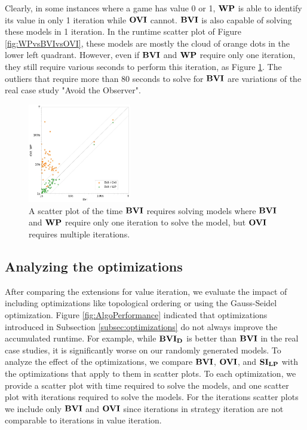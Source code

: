 Clearly, in some instances where a game has value 0 or 1, $\mathbf{WP}$ is able to identify its value in only 1 iteration while $\mathbf{OVI}$ cannot.
$\BVI$ is also capable of solving these models in 1 iteration.
In the runtime scatter plot of Figure \ref{fig:WPvsBVIvsOVI}, these models are mostly the cloud of orange dots in the lower left quadrant.
However, even if $\BVI$ and $\mathbf{WP}$ require only one iteration, they still require various seconds to perform this iteration, as Figure \ref{fig:BVI1IterationTime}.
The outliers that require more than 80 seconds to solve for $\BVI$ are variations of the real case study "Avoid the Observer".
\begin{figure}[h!]
    \centering
    \includegraphics[width=0.4\textwidth]{figures/BVI_1_Iteration_vs_OVI.jpg}
    \caption[Time $\BVI$ requires solving models where it only needs one iteration]{
        A scatter plot of the time $\BVI$ requires solving models where $\BVI$ and $\mathbf{WP}$ require only one iteration to solve the model, 
        but $\mathbf{OVI}$ requires multiple iterations. 
    }
    \label{fig:BVI1IterationTime}
\end{figure}
\FloatBarrier

\subsection{Analyzing the optimizations}
After comparing the extensions for value iteration, we evaluate the impact of including optimizations like topological ordering or using the Gauss-Seidel optimization.
Figure \ref{fig:AlgoPerformance} indicated that optimizations introduced in Subsection \ref{subsec:optimizations} do not always improve the accumulated runtime. 
For example, while $\mathbf{BVI_D}$ is better than $\BVI$ in the real case studies, it is significantly worse on our randomly generated models.
To analyze the effect of the optimizations, we compare $\BVI$, $\mathbf{OVI}$, and $\mathbf{SI_{LP}}$ with the optimizations that apply to them in scatter plots.
To each optimization, we provide a scatter plot with time required to solve the models, and one scatter plot with iterations required to solve the models.
For the iterations scatter plots we include only $\BVI$ and $\mathbf{OVI}$ since iterations in strategy iteration are not comparable to iterations in value iteration.

